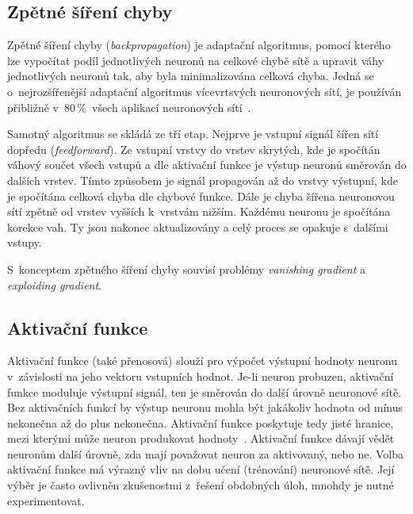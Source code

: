 
\subsection*{Zpětné šíření chyby}

Zpětné šíření chyby (\textit{backpropagation}) je adaptační algoritmus, pomocí kterého lze vypočítat podíl jednotlivých neuronů na celkové chybě sítě a upravit váhy jednotlivých neuronů tak, aby byla minimalizována celková chyba. Jedná se o~nejrozšířenější adaptační algoritmus vícevrtsvých neuronových sítí, je používán přibližně v~80\,\%~všech aplikací neuronových sítí~\cite{ostravaNeuralNetworks}.

Samotný algoritmus se skládá ze tří etap. Nejprve je vstupní signál šířen sítí dopředu (\textit{feedforward}). Ze vstupní vrstvy do vrstev skrytých, kde je spočítán váhový součet všech vstupů a dle aktivační funkce je výstup neuronů směrován do dalších vrstev. Tímto způsobem je signál propagován až do vrstvy výstupní, kde je spočítána celková chyba dle chybové funkce. Dále je chyba šířena neuronovou sítí zpětně od vrstev vyšších k~vrstvám nižším. Každému neuronu je spočítána korekce vah. Ty jsou nakonec aktualizovány a celý proces se opakuje s~dalšími vstupy.

S~konceptem zpětného šíření chyby souvisí problémy \textit{vanishing gradient} a \textit{exploiding gradient}.


\subsection*{Aktivační funkce}
\label{subsec_activ_function}

Aktivační funkce (také přenosová) slouží pro výpočet výstupní hodnoty neuronu v~závislosti na jeho vektoru vstupních hodnot. Je-li neuron probuzen, aktivační funkce moduluje výstupní signál, ten je směrován do další úrovně neuronové sítě. Bez aktivačních funkcí by výstup neuronu mohla být jakákoliv hodnota od mínus nekonečna až do plus nekonečna. Aktivační funkce poskytuje tedy jisté hranice, mezi kterými může neuron produkovat hodnoty~\cite{mediumActivationFunctions}. Aktivační funkce dávají vědět neuronům další úrovně, zda mají považovat neuron za aktivovaný, nebo ne. Volba aktivační funkce má výrazný vliv na dobu učení (trénování) neuronové sítě. Její výběr je často ovlivněn zkušenostmi z~řešení obdobných úloh, mnohdy je nutné experimentovat.


